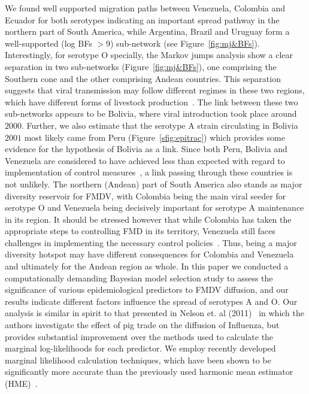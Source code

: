 \documentclass[10pt]{article}
\begin{document}
We found well supported migration paths between Venezuela, Colombia and Ecuador for both serotypes indicating an important spread pathway in the northern part of South America, while Argentina, Brazil and Uruguay form a well-supported (log BFs $> 9$) sub-network (see Figure~\ref{fig:mj&BFs}).
Interestingly, for serotype O specially, the Markov jumps analysis show a clear separation in two sub-networks (Figure~\ref{fig:mj&BFs}), one comprising the Southern cone and the other comprising Andean countries.
This separation suggests that viral transmission may follow different regimes in these two regions, which have different forms of livestock production~\cite{Saraiva2003,Naranjo2013}.
The link between these two sub-networks appears to be Bolivia, where viral introduction took place around $2000$. 
Further, we also estimate that the serotype A strain circulating in Bolivia $2001$ most likely came from Peru (Figure~\ref{sfig:epitrac}) which provides some evidence for the hypothesis of Bolivia as a link.
Since both Peru, Bolivia and Venezuela are considered to have achieved less than expected with regard to implementation of control measures~\cite{Naranjo2013}, a link passing through these countries is not unlikely.
The northern (Andean) part of South America also stands as major diversity reservoir for FMDV, with Colombia being the main viral seeder for serotype O and Venezuela being decisively important for serotype A maintenance in its region.
It should be stressed however that while Colombia has taken the appropriate steps to controlling FMD in its territory, Venezuela still faces challenges in implementing the necessary control policies~\cite{Naranjo2013}.
Thus, being a major diversity hotspot may have different consequences for Colombia and Venezuela and ultimately for the Andean region as whole.
In this paper we conducted a computationally demanding Bayesian model selection study to assess the significance of various epidemiological predictors to FMDV diffusion, and our results indicate different factors influence the spread of serotypes A and O.
Our analysis is similar in spirit to that presented in Nelson et. al (2011)~\cite{Nelson2011} in which the authors investigate the effect of pig trade on the diffusion of Influenza, but provides substantial improvement over the methods used to calculate the marginal log-likelihoods for each predictor.
We employ recently developed marginal likelihood calculation techniques, which have been shown to be significantly more accurate than the previously used harmonic mean estimator (HME)~\cite{Baele2012, Baele2013a, Baele2013b}.
\end{document}
